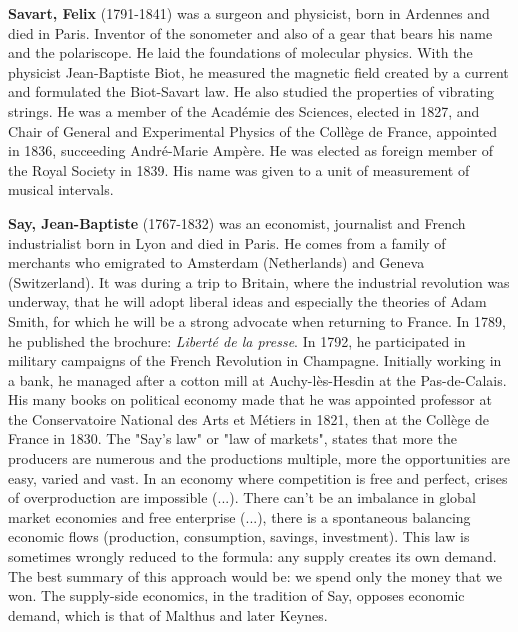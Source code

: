\textbf{Savart, Felix} (1791-1841) was a surgeon and physicist, born in Ardennes and died in Paris. Inventor of the sonometer and also of a gear that bears his name and the polariscope. He laid the foundations of molecular physics. With the physicist Jean-Baptiste Biot, he measured the magnetic field created by a current and formulated the Biot-Savart law. He also studied the properties of vibrating strings. He was a member of the Académie des Sciences, elected in 1827, and Chair of General and Experimental Physics of the Collège de France, appointed in 1836, succeeding André-Marie Ampère. He was elected as foreign member of the Royal Society in 1839. His name was given to a unit of measurement of musical intervals.

\textbf{Say, Jean-Baptiste} (1767-1832) was an economist, journalist and French industrialist born in Lyon and died in Paris. He comes from a family of merchants who emigrated to Amsterdam (Netherlands) and Geneva (Switzerland). It was during a trip to Britain, where the industrial revolution was underway, that he will adopt liberal ideas and especially the theories of Adam Smith, for which he will be a strong advocate when returning to France. In 1789, he published the brochure: \textit{Liberté de la presse}. In 1792, he participated in military campaigns of the French Revolution in Champagne. Initially working in a bank, he managed after a cotton mill at Auchy-lès-Hesdin at the Pas-de-Calais. His many books on political economy made that he was appointed professor at the Conservatoire National des Arts et Métiers in 1821, then at the Collège de France in 1830. The "Say's law" or "law of markets", states that more the producers are numerous and the productions multiple, more the opportunities are easy, varied and vast. In an economy where competition is free and perfect, crises of overproduction are impossible (...). There can't be an imbalance in global market economies and free enterprise (...), there is a spontaneous balancing economic flows (production, consumption, savings, investment). This law is sometimes wrongly reduced to the formula: any supply creates its own demand. The best summary of this approach would be: we spend only the money that we won. The supply-side economics, in the tradition of Say, opposes economic demand, which is that of Malthus and later Keynes.

